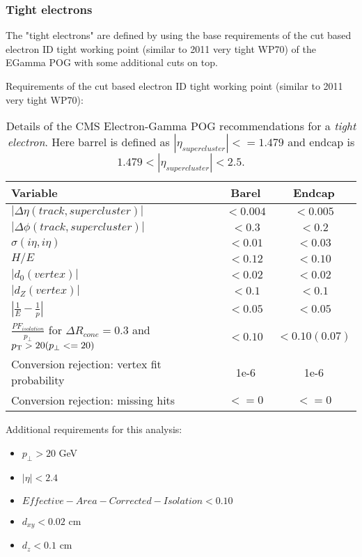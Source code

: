 \subsubsection{Tight electrons}
 
The "tight electrons" are defined by using the base requirements of the cut based electron ID tight working point (similar to 2011 very tight WP70) of the EGamma POG with some additional cuts on top.
  
Requirements of the cut based electron ID tight working point (similar to 2011 very tight WP70):

\begin{table}[htp]
  
\begin{tabular}{|l|c|c|}
\hline
Variable & Barel & Endcap \\
\hline\hline
$| \Delta\eta(track,supercluster) |$                           & $<0.004$ & $<0.005$ \\
$| \Delta\phi(track,supercluster) |$                           & $<0.3  $ & $<0.2  $ \\
$ \sigma(i\eta,i\eta)$                                         & $<0.01 $ & $<0.03 $ \\
$H/E$                                                          & $<0.12 $ & $<0.10 $ \\
$|d_{0}(vertex)|$                                              & $<0.02 $ & $<0.02 $ \\
$|d_{Z}(vertex)|$                                              & $<0.1  $ & $<0.1  $ \\
$|\frac{1}{E}-\frac{1}{p}| $                                   & $<0.05 $ & $<0.05 $ \\
$\frac{PF_{isolation}}{p_{\perp}}$ for $ \Delta R_{cone}=0.3$ and $p_{\mathrm{T}} > 20 (p_{\perp} <= 20) $ & $<0.10 $ & $<0.10(0.07)$ \\
Conversion rejection: vertex fit probability                   & 1e-6 & 1e-6 \\
Conversion rejection: missing hits                             & $<=0$ & $<=0$ \\
\hline
\end{tabular}
\caption{Details of the \gls{CMS} Electron-Gamma \gls{POG} recommendations for a \textit{tight electron}. Here barrel is defined as $ |\eta_{supercluster}|<=1.479 $ and endcap is $ 1.479 < |\eta_{supercluster}| < 2.5 $.} 
\end{table}

Additional requirements for this analysis:
\begin{itemize}
  \item $ p_{\perp} > 20 $ GeV
  \item $ |\eta| < 2.4 $
  \item $ Effective-Area-Corrected-Isolation < 0.10 $
  \item $d_{xy}<0.02 $ cm
  \item $d_{z} < 0.1 $ cm
\end{itemize}


